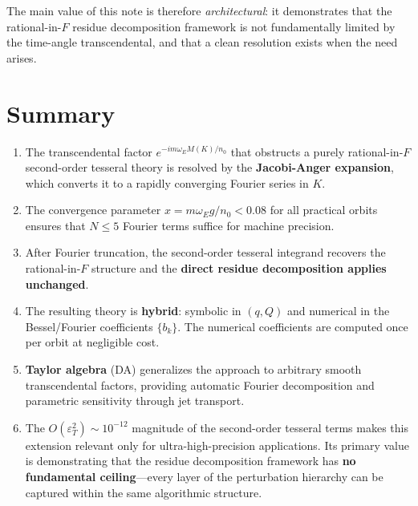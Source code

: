 \documentclass[11pt]{article}
\newcommand{\eps}{\varepsilon}
\begin{document}
The main value of this note is therefore \emph{architectural}: it
demonstrates that the rational-in-$F$ residue decomposition framework
is not fundamentally limited by the time-angle transcendental, and that
a clean resolution exists when the need arises.


\section{Summary}
\label{sec:summary}

\begin{enumerate}
\item The transcendental factor $e^{-im\omega_E M(K)/n_0}$ that obstructs
a purely rational-in-$F$ second-order tesseral theory is resolved by the
\textbf{Jacobi-Anger expansion}, which converts it to a rapidly converging
Fourier series in $K$.

\item The convergence parameter $x = m\omega_E g / n_0 < 0.08$ for all
practical orbits ensures that $N \le 5$ Fourier terms suffice for machine
precision.

\item After Fourier truncation, the second-order tesseral integrand
recovers the rational-in-$F$ structure and the \textbf{direct residue
decomposition applies unchanged}.

\item The resulting theory is \textbf{hybrid}: symbolic in $(q, Q)$
and numerical in the Bessel/Fourier coefficients $\{b_k\}$. The
numerical coefficients are computed once per orbit at negligible cost.

\item \textbf{Taylor algebra} (DA) generalizes the approach to arbitrary
smooth transcendental factors, providing automatic Fourier decomposition
and parametric sensitivity through jet transport.

\item The $O(\eps_T^2) \sim 10^{-12}$ magnitude of the second-order
tesseral terms makes this extension relevant only for ultra-high-precision
applications. Its primary value is demonstrating that the residue
decomposition framework has \textbf{no fundamental ceiling}---every layer
of the perturbation hierarchy can be captured within the same algorithmic
structure.
\end{enumerate}
\end{document}
